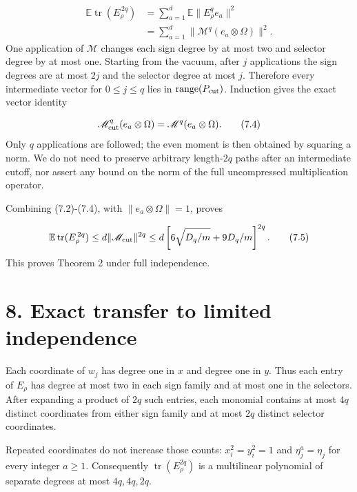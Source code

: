 \documentclass[11pt,a4paper]{article}
\begin{document}
\begin{equation}
\begin{aligned}
\mathbb E\operatorname{tr}(E_\rho^{\,2q})
&=\sum_{a=1}^d\mathbb E\|E_\rho^q e_a\|^2\\
&=\sum_{a=1}^d
\|\mathscr M^q(e_a\otimes\Omega)\|^2 .
\end{aligned}
\tag{7.3}
\end{equation}
One application of \(\mathscr M\) changes each sign degree by at most two and selector degree by at most one. Starting from the vacuum, after \(j\) applications the sign degrees are at most \(2j\) and the selector degree at most \(j\). Therefore every intermediate vector for \(0\le j\le q\) lies in \(\operatorname{range}(P_{\rm cut})\). Induction gives the exact vector identity

\begin{equation}
\mathscr M_{\rm cut}^q(e_a\otimes\Omega)
=\mathscr M^q(e_a\otimes\Omega).
\tag{7.4}
\end{equation}
Only \(q\) applications are followed; the even moment is then obtained by squaring a norm. We do not need to preserve arbitrary length-\(2q\) paths after an intermediate cutoff, nor assert any bound on the norm of the full uncompressed multiplication operator.

Combining (7.2)-(7.4), with \(\|e_a\otimes\Omega\|=1\), proves

\begin{equation}
\mathbb E\operatorname{tr}(E_\rho^{\,2q})
\le d\|\mathscr M_{\rm cut}\|^{2q}
\le d\left[6\sqrt{D_q/m}+9D_q/m\right]^{2q}.
\tag{7.5}
\end{equation}
This proves Theorem 2 under full independence.

\section*{8. Exact transfer to limited independence}
Each coordinate of \(w_j\) has degree one in \(x\) and degree one in \(y\). Thus each entry of \(E_\rho\) has degree at most two in each sign family and at most one in the selectors. After expanding a product of \(2q\) such entries, each monomial contains at most \(4q\) distinct coordinates from either sign family and at most \(2q\) distinct selector coordinates.

Repeated coordinates do not increase those counts: \(x_i^2=y_i^2=1\) and \(\eta_j^a=\eta_j\) for every integer \(a\ge1\). Consequently \(\operatorname{tr}(E_\rho^{2q})\) is a multilinear polynomial of separate degrees at most \(4q,4q,2q\).
\end{document}
